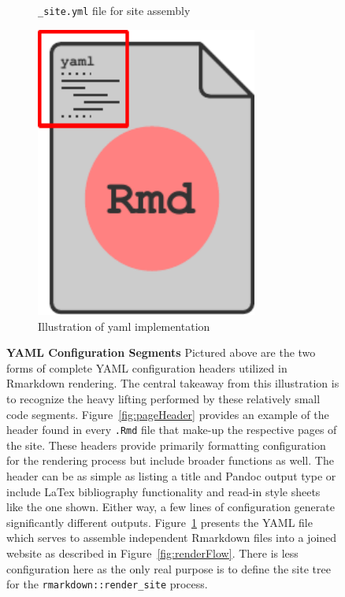 \documentclass[10pt]{report}
\begin{document}
\begin{figure}
\begin{subfigure}[t]{.3\textwidth}
        \caption{\texttt{\_site.yml} file for site assembly}\label{fig:siteYaml}
    \end{subfigure}
    \hspace{2em}
    \begin{subfigure}[t]{.2\textwidth}
        \center{}
        \includegraphics[width=0.8\textwidth]{fig/yaml_illustration.pdf}
        \caption{Illustration of yaml implementation}\label{fig:yamlIllust}
    \end{subfigure}
    \caption[YAML Configuration Segments]{\textbf{YAML Configuration Segments} Pictured above are the two forms of complete YAML configuration headers utilized in Rmarkdown rendering. The central takeaway from this illustration is to recognize the heavy lifting performed by these relatively small code segments. Figure~\ref{fig:pageHeader} provides an example of the header found in every \texttt{.Rmd} file that make-up the respective pages of the site. These headers provide primarily formatting configuration for the rendering process but include broader functions as well. The header can be as simple as listing a title and Pandoc output type or include LaTex bibliography functionality and read-in style sheets like the one shown. Either way, a few lines of configuration generate significantly different outputs. Figure~\ref{fig:siteYaml} presents the YAML file which serves to assemble independent Rmarkdown files into a joined website as described in Figure~\ref{fig:renderFlow}. There is less configuration here as the only real purpose is to define the site tree for the \texttt{rmarkdown::render\_site} process.}\label{fig:yamls}
\end{figure}
\end{document}
